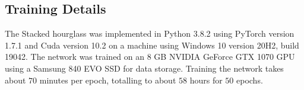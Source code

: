 \documentclass[./main.tex]{subfiles}
\begin{document}
\subsection{Training Details}\label{subsec:training_details}
The Stacked hourglass was implemented in Python 3.8.2 using PyTorch version 1.7.1 and Cuda version 10.2 on a machine using Windows 10 version 20H2, build 19042. The network was trained on an 8 GB NVIDIA GeForce GTX 1070 GPU using a Samsung 840 EVO SSD for data storage. Training the network takes about $70$ minutes per epoch, totalling to about $58$ hours for $50$ epochs.
\end{document}
